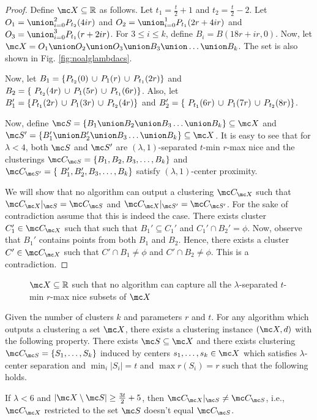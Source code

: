 \documentclass[11pt]{article}
\begin{document}
\begin{proof}
Define $\mc X \subseteq \mathbb{R}$ as follows. Let $t_1 = \frac{t}{2}+1$ and $t_2 = \frac{t}{2}-2$. Let $O_1 = \union_{i=0}^2 P_{t_2}(4ir)$ and $O_2 = \union_{i=0}^1 P_{t_1}(2r+4ir)$ and $O_3 = \union_{i=0}^3 P_{t_1}(r+2ir)$. For $3\le i\le k$, define $B_i = B(18r+ir, 0)$. Now, let $\mc X = O_1 \union O_2 \union O_3 \union B_3 \union \ldots \union B_k$. The set is also shown in Fig. \ref{fig:noalglambdacs}.

Now, let $B_1 = \{P_{t_2}(0) \thinspace\cup\thinspace  P_{1}(r) \thinspace\cup\thinspace P_{t_1}(2r) \}$ and $B_2 = \{\ P_{t_2}(4r) \thinspace\cup\thinspace P_{1}(5r)\thinspace\cup\thinspace P_{t_1}(6r)\}$. Also, let $B_1' = \{P_{t_1}(2r) \thinspace\cup\thinspace  P_{1}(3r) \thinspace\cup\thinspace P_{t_2}(4r) \}$ and $B_2' = \{\ P_{t_1}(6r) \thinspace\cup\thinspace P_{1}(7r)\thinspace\cup\thinspace P_{t_2}(8r)\}$.

Now, define $\mc S = \{B_1 \union B_2 \union B_3\ldots \union B_k\} \subseteq \mc X$ and $\mc S' = \{B_1' \union B_2' \union B_3\ldots \union B_k\} \subseteq \mc X$. It is easy to see that for $\lambda < 4$, both $\mc S$ and $\mc S'$ are $(\lambda, 1)$-separated $t$-min $r$-max nice and the clusterings $\mc C_{\mc S} = \{B_1, B_2, B_3, \ldots, B_k\}$ and $\mc C_{\mc S'} = \{\ B_1', B_2', B_3, \ldots, B_k\}$ satisfy $(\lambda, 1)$-center proximity. 

We will show that no algorithm can output a clustering $\mc C_{\mc X}$ such that $\mc C_{\mc X}|_{\mc S} = \mc C_{\mc S}$ and $\mc C_{\mc X}|_{\mc S'} = \mc C_{\mc S'}$. For the sake of contradiction assume that this is indeed the case. There exists cluster $C_1' \in \mc C_{\mc X}$ such that such that $B_1' \subseteq C_1'$ and $C_1' \cap B_2' = \phi$. Now, observe that $B_1'$ contains points from both $B_1$ and $B_2$. Hence, there exists a cluster $C' \in \mc C_{\mc X}$ such that $C' \cap B_1 \neq \phi$ and $C' \cap B_2 \neq \phi$. This is a contradiction.
\end{proof}

\begin{figure}[!ht]

\caption{$\mc X \subseteq \mathbb{R}$ such that no algorithm can capture all the $\lambda$-separated $t$-min $r$-max nice subsets of $\mc X$}
\label{fig:nosparsealglambdacs}
\end{figure}

\begin{theorem}
Given the number of clusters $k$ and parameters $r$ and $t$. For any algorithm which outputs a clustering a set $\mc X$, there exists a clustering instance $(\mc X, d)$ with the following property. There exists $\mc S \subseteq \mc X$ and there exists clustering $\mc C_{\mc S} = \{S_1, \ldots, S_k\}$ induced by centers $s_1, \ldots, s_k \in \mc X$ which satisfies $\lambda$-center separation and $\min_i |S_i| = t$ and $\max r(S_i) = r$ such that the following holds.

If $\lambda < 6$ and $|\mc X\setminus \mc S|\ge \frac{3t}{2}+5$, then $\mc C_{\mc X}|_{\mc S} \neq \mc C_{\mc S}$, i.e., $\mc C_{\mc X}$ restricted to the set $\mc S$ doesn't equal $\mc C_{\mc S}$.
\end{theorem}
\end{document}

